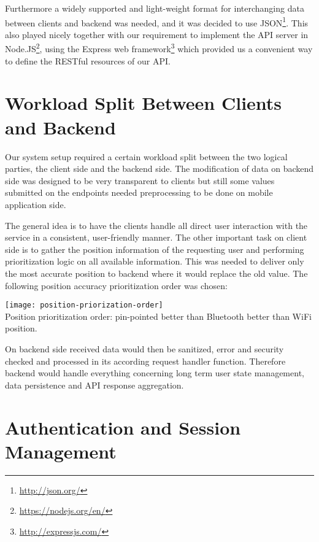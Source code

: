 Furthermore a widely supported and light-weight format for interchanging data between clients and backend was needed, and it was decided to use JSON\footnote{\url{http://json.org/}}. This also played nicely together with our requirement to implement the API server in Node.JS\footnote{\url{https://nodejs.org/en/}}, using the Express web framework\footnote{\url{http://expressjs.com/}} which provided us a convenient way to define the RESTful resources of our API.


\vspace{0.5cm}

\section{Workload Split Between Clients and Backend}

Our system setup required a certain workload split between the two logical parties, the client side and the backend side. The modification of data on backend side was designed to be very transparent to clients but still some values submitted on the endpoints needed preprocessing to be done on mobile application side.

The general idea is to have the clients handle all direct user interaction with the service in a consistent, user-friendly manner. The other important task on client side is to gather the position information of the requesting user and performing prioritization logic on all available information. This was needed to deliver only the most accurate position to backend where it would replace the old value. The following position accuracy prioritization order was chosen:
\begin{center}
    \texttt{[image: position-priorization-order]}\\
    Position prioritization order: pin-pointed better than Bluetooth better than WiFi position.
    \label{fig:position-priorization}
\end{center}

On backend side received data would then be sanitized, error and security checked and processed in its according request handler function. Therefore backend would handle everything concerning long term user state management, data persistence and API response aggregation.


\vspace{0.5cm}

\section{Authentication and Session Management}
\label{concept-authentication}

